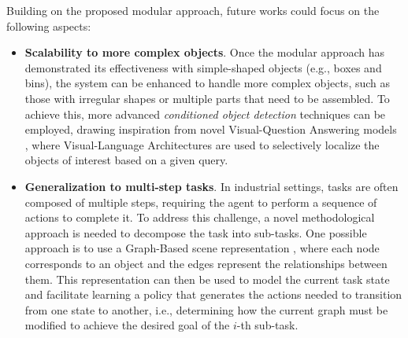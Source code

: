 Building on the proposed modular approach, future works could focus on the following aspects:
\begin{itemize}
    \item \textbf{Scalability to more complex objects}. Once the modular approach has demonstrated its effectiveness with simple-shaped objects (e.g., boxes and bins), the system can be enhanced to handle more complex objects, such as those with irregular shapes or multiple parts that need to be assembled. To achieve this, more advanced \textit{conditioned object detection} techniques can be employed, drawing inspiration from novel Visual-Question Answering models \cite{wen2024object}, where Visual-Language Architectures are used to selectively localize the objects of interest based on a given query. 

    \item \textbf{Generalization to multi-step tasks}. In industrial settings, tasks are often composed of multiple steps, requiring the agent to perform a sequence of actions to complete it. To address this challenge, a novel methodological approach is needed to decompose the task into sub-tasks. One possible approach is to use a Graph-Based scene representation \cite{di2023one}, where each node corresponds to an object and the edges represent the relationships between them. This representation can then be used to model the current task state and facilitate learning a policy that generates the actions needed to transition from one state to another, i.e., determining how the current graph must be modified to achieve the desired goal of the $i$-th sub-task. 
\end{itemize}





